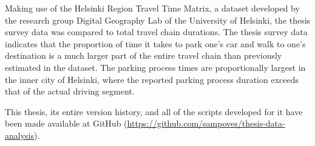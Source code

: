 Making use of the Helsinki Region Travel Time Matrix, a dataset developed by the research group Digital Geography Lab of the University of Helsinki, the thesis survey data was compared to total travel chain durations. The thesis survey data indicates that the proportion of time it takes to park one's car and walk to one's destination is a much larger part of the entire travel chain than previously estimated in the dataset. The parking process times are proportionally largest in the inner city of Helsinki, where the reported parking process duration exceeds that of the actual driving segment.

This thesis, its entire version history, and all of the scripts developed for it have been made available at GitHub (\textcolor{blue}{\url{https://github.com/sampoves/thesis-data-analysis}}).